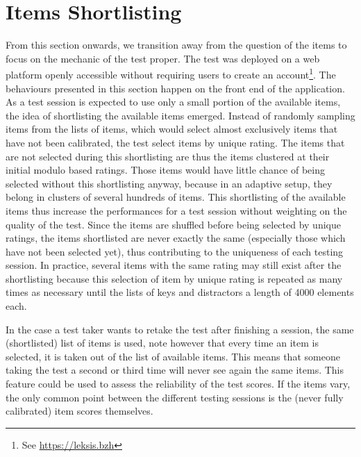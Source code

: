 \section{Items Shortlisting}
From this section onwards, we transition away from the question of the items to focus on the mechanic of the test proper. The test was deployed on a web platform openly accessible without requiring users to create an account\footnote{See \href{https://leksis.bzh}{https://leksis.bzh}}. The behaviours presented in this section happen on the front end of the application. As a test session is expected to use only a small portion of the available items, the idea of shortlisting the available items emerged. Instead of randomly sampling items from the lists of items, which would select almost exclusively items that have not been calibrated, the test select items by unique rating. The items that are not selected during this shortlisting are thus the items clustered at their initial modulo based ratings. Those items would have little chance of being selected without this shortlisting anyway, because in an adaptive setup, they belong in clusters of several hundreds of items. This shortlisting of the available items thus increase the performances for a test session without weighting on the quality of the test. Since the items are shuffled before being selected by unique ratings, the items shortlisted are never exactly the same (especially those which have not been selected yet), thus contributing to the uniqueness of each testing session. In practice, several items with the same rating may still exist after the shortlisting because this selection of item by unique rating is repeated as many times as necessary until the lists of keys and distractors a length of 4000 elements each.

In the case a test taker wants to retake the test after finishing a session, the same (shortlisted) list of items is used, note however that every time an item is selected, it is taken out of the list of available items. This means that someone taking the test a second or third time will never see again the same items. This feature could be used to assess the reliability of the test scores. If the items vary, the only common point between the different testing sessions is the (never fully calibrated) item scores themselves.

